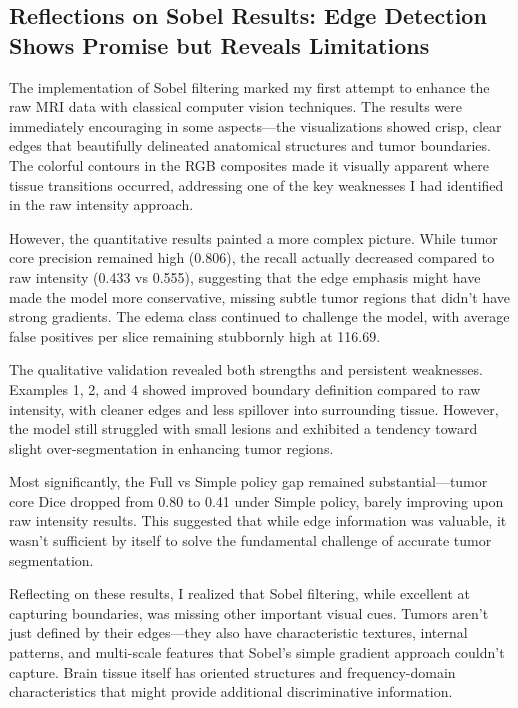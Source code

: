 \clearpage






\subsection{Reflections on Sobel Results: Edge Detection Shows Promise but Reveals Limitations}
\label{sec:sobel_reflections}

The implementation of Sobel filtering marked my first attempt to enhance the raw MRI data with classical computer vision techniques. The results were immediately encouraging in some aspects—the visualizations showed crisp, clear edges that beautifully delineated anatomical structures and tumor boundaries. The colorful contours in the RGB composites made it visually apparent where tissue transitions occurred, addressing one of the key weaknesses I had identified in the raw intensity approach.

However, the quantitative results painted a more complex picture. While tumor core precision remained high (0.806), the recall actually decreased compared to raw intensity (0.433 vs 0.555), suggesting that the edge emphasis might have made the model more conservative, missing subtle tumor regions that didn't have strong gradients. The edema class continued to challenge the model, with average false positives per slice remaining stubbornly high at 116.69.

The qualitative validation revealed both strengths and persistent weaknesses. Examples 1, 2, and 4 showed improved boundary definition compared to raw intensity, with cleaner edges and less spillover into surrounding tissue. However, the model still struggled with small lesions and exhibited a tendency toward slight over-segmentation in enhancing tumor regions.

Most significantly, the Full vs Simple policy gap remained substantial—tumor core Dice dropped from 0.80 to 0.41 under Simple policy, barely improving upon raw intensity results. This suggested that while edge information was valuable, it wasn't sufficient by itself to solve the fundamental challenge of accurate tumor segmentation.

Reflecting on these results, I realized that Sobel filtering, while excellent at capturing boundaries, was missing other important visual cues. Tumors aren't just defined by their edges—they also have characteristic textures, internal patterns, and multi-scale features that Sobel's simple gradient approach couldn't capture. Brain tissue itself has oriented structures and frequency-domain characteristics that might provide additional discriminative information.

